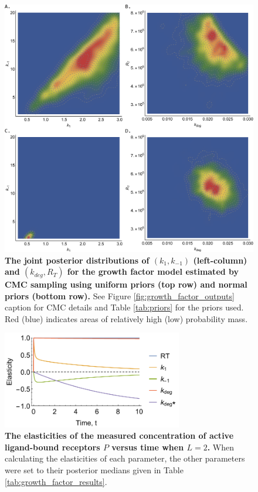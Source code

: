 \begin{figure}[H]
	\centerline{\includegraphics[width=\textwidth]{../figures/growth_factor_inputs.png}}
	\caption{\textbf{The joint posterior distributions of $(k_1,k_{-1})$ (left-column) and $(k_{deg},R_T)$ for the growth factor model estimated by CMC sampling using uniform priors (top row) and normal priors (bottom row).} See Figure \ref{fig:growth_factor_outputs} caption for CMC details and Table \ref{tab:priors} for the priors used. Red (blue) indicates areas of relatively high (low) probability mass.}
	\label{fig:growth_factor_inputs}
\end{figure}

\begin{figure}[H]
	\centerline{\includegraphics[width=0.7\textwidth]{../figures/dixit_elasticities.pdf}}
	\caption{\textbf{The elasticities of the measured concentration of active ligand-bound receptors $P$ versus time when $L=2$.} When calculating the elasticities of each parameter, the other parameters were set to their posterior medians given in Table \ref{tab:growth_factor_results}.}
	\label{fig:dixit_elasticities}
\end{figure}


